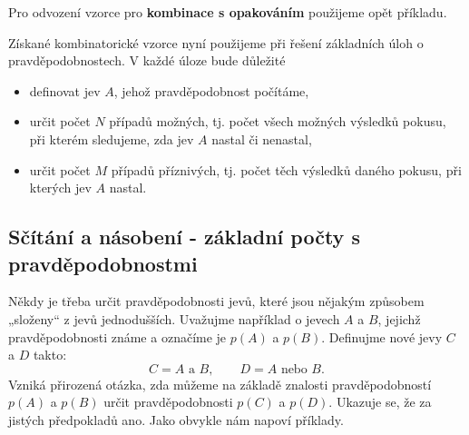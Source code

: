       Pro odvození vzorce pro \textbf{kombinace s opakováním} použijeme opět příkladu.
      
      
      
      
      Získané kombinatorické vzorce nyní použijeme při řešení základních úloh o pravděpodobnostech. 
      V každé úloze bude důležité
      \begin{itemize}
        \item definovat jev \(A\), jehož pravděpodobnost počítáme,
        \item určit počet \(N\) případů možných, tj. počet všech možných výsledků pokusu, při 
              kterém sledujeme, zda jev \(A\) nastal či nenastal,
        \item určit počet \(M\) případů příznivých, tj. počet těch výsledků daného pokusu, při 
              kterých jev \(A\) nastal.
      \end{itemize}

      

      

      

    \subsection{Sčítání a násobení - základní počty s pravděpodobnostmi}
      Někdy je třeba určit pravděpodobnosti jevů, které jsou nějakým způsobem „složeny“ z jevů
      jednodušších. Uvažujme například o jevech \(A\) a \(B\), jejichž pravděpodobnosti známe a 
      označíme je \(p(A)\) a \(p(B)\). Definujme nové jevy \(C\) a \(D\) takto:
      \begin{equation*}
        C = A \text{ a } B, \qquad D = A \text{ nebo } B.
      \end{equation*}
      Vzniká přirozená otázka, zda můžeme na základě znalosti pravděpodobností \(p(A)\) a \(p(B)\) 
      určit pravděpodobnosti \(p(C)\) a \(p(D)\). Ukazuje se, že za jistých předpokladů ano. Jako 
      obvykle nám napoví příklady.


